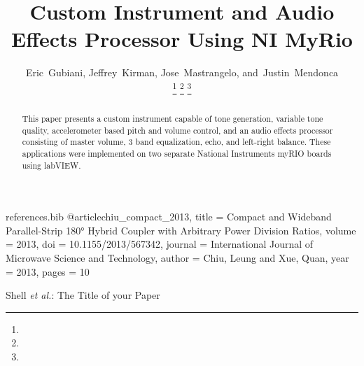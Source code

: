 \begin{filecontents*}{references.bib}
@article{chiu_compact_2013,
	title = {Compact and Wideband Parallel-Strip 180° Hybrid Coupler with Arbitrary Power Division Ratios},
	volume = {2013},
	doi = {10.1155/2013/567342},
	journal = {International Journal of Microwave Science and Technology},
	author = {Chiu, Leung and Xue, Quan},
	year = {2013},
	pages = {10}
}
\end{filecontents*}
%


%
\title{Custom Instrument and Audio Effects Processor Using NI MyRio}
%
%
%

\author{Eric~Gubiani, Jeffrey~Kirman, Jose~Mastrangelo, and~Justin~Mendonca

\thanks{ 
 }
\thanks{}%
\thanks{}%
}


\markboth{}%
{Shell \MakeLowercase{\textit{et al.}}: The Title of your Paper}
%

\maketitle

\begin{abstract}
This paper presents a custom instrument capable of tone generation, variable tone quality, accelerometer based pitch and volume control, and an audio effects processor consisting of master volume, 3 band equalization, echo, and left-right balance. 
These applications were implemented on two separate National Instruments myRIO boards using labVIEW. 
\end{abstract}

